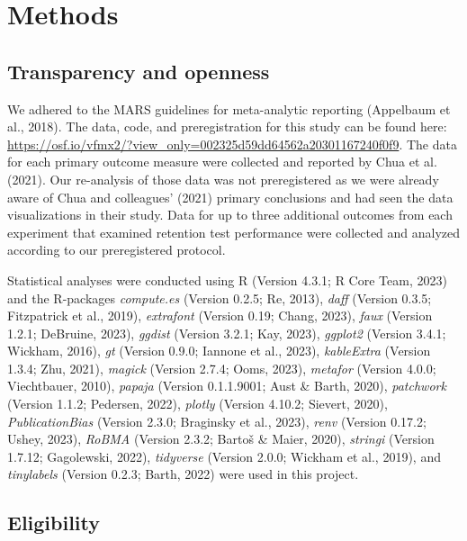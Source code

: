 \documentclass[
  man, donotrepeattitle,floatsintext]{apa7}
\begin{document}
\hypertarget{methods}{%
\section{Methods}\label{methods}}

\hypertarget{transparency-and-openness}{%
\subsection{Transparency and openness}\label{transparency-and-openness}}

We adhered to the MARS guidelines for meta-analytic reporting (Appelbaum et al., 2018). The data, code, and preregistration for this study can be found here: \url{https://osf.io/vfmx2/?view_only=002325d59dd64562a20301167240f0f9}. The data for each primary outcome measure were collected and reported by Chua et al. (2021). Our re-analysis of those data was not preregistered as we were already aware of Chua and colleagues' (2021) primary conclusions and had seen the data visualizations in their study. Data for up to three additional outcomes from each experiment that examined retention test performance were collected and analyzed according to our preregistered protocol.

Statistical analyses were conducted using R (Version 4.3.1; R Core Team, 2023) and the R-packages \emph{compute.es} (Version 0.2.5; Re, 2013), \emph{daff} (Version 0.3.5; Fitzpatrick et al., 2019), \emph{extrafont} (Version 0.19; Chang, 2023), \emph{faux} (Version 1.2.1; DeBruine, 2023), \emph{ggdist} (Version 3.2.1; Kay, 2023), \emph{ggplot2} (Version 3.4.1; Wickham, 2016), \emph{gt} (Version 0.9.0; Iannone et al., 2023), \emph{kableExtra} (Version 1.3.4; Zhu, 2021), \emph{magick} (Version 2.7.4; Ooms, 2023), \emph{metafor} (Version 4.0.0; Viechtbauer, 2010), \emph{papaja} (Version 0.1.1.9001; Aust \& Barth, 2020), \emph{patchwork} (Version 1.1.2; Pedersen, 2022), \emph{plotly} (Version 4.10.2; Sievert, 2020), \emph{PublicationBias} (Version 2.3.0; Braginsky et al., 2023), \emph{renv} (Version 0.17.2; Ushey, 2023), \emph{RoBMA} (Version 2.3.2; Bartoš \& Maier, 2020), \emph{stringi} (Version 1.7.12; Gagolewski, 2022), \emph{tidyverse} (Version 2.0.0; Wickham et al., 2019), and \emph{tinylabels} (Version 0.2.3; Barth, 2022) were used in this project.

\hypertarget{eligibility}{%
\subsection{Eligibility}\label{eligibility}}
\end{document}
